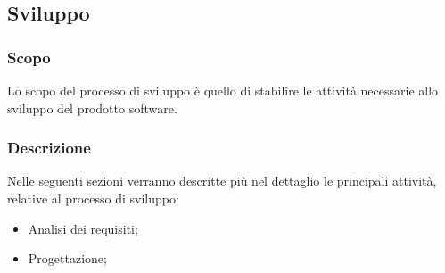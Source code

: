 \subsection{Sviluppo}

\subsubsection{Scopo}
Lo scopo del processo di sviluppo è quello di stabilire le attività necessarie allo sviluppo del prodotto software.

\subsubsection{Descrizione}
Nelle seguenti sezioni verranno descritte più nel dettaglio le principali attività, relative al processo di sviluppo:
\begin{itemize} 
    \item Analisi dei requisiti;
	\item Progettazione;
\end{itemize}



